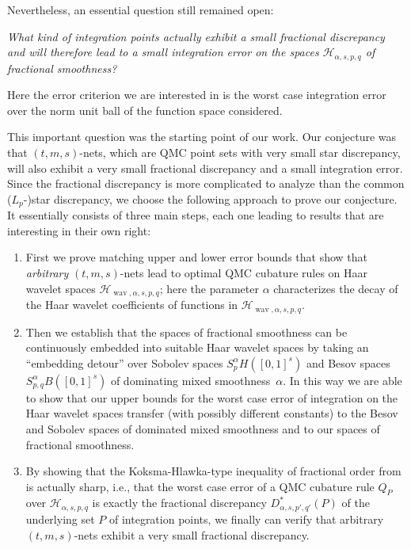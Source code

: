 \documentclass[12pt]{article}
\DeclareMathOperator{\wav}{wav}
\newcommand{\red}[1]{\textcolor{red}{#1}}
\begin{document}
Nevertheless, an essential question still remained open: 
\vspace{1.5ex}

\emph{What kind of integration points actually exhibit a small fractional discrepancy and will therefore lead to a small integration error on the spaces
$\mathcal{H}_{\alpha, s, p,q}$ of fractional smoothness?}
\vspace{1.5ex}

Here the error criterion we are interested in is the worst case integration error over the norm unit ball of the function space considered.

This important question was the starting point of our work.
Our conjecture was that $(t,m,s)$-nets, which are QMC point sets with very small star discrepancy, will also exhibit a very small fractional discrepancy and a small integration error.
Since the fractional discrepancy is more complicated to analyze than the common ($L_{p}$-)star discrepancy, we choose %
the following approach to prove our conjecture. It essentially consists of three main steps, each one leading to results that are interesting in their own right: 
\begin{enumerate}
\item First we prove matching upper and lower error bounds that show that \emph{arbitrary} $(t,m,s)$-nets lead to optimal QMC cubature rules on Haar wavelet  spaces $\mathcal{H}_{\wav, \alpha, s, p,q}$; here the parameter $\alpha$ characterizes the decay of the Haar wavelet coefficients of functions in $\mathcal{H}_{\wav, \alpha, s, p,q}$. 
\item Then we establish that %
the spaces of fractional smoothness %
can be continuously embedded into %
suitable Haar wavelet spaces
by taking an ``embedding detour'' over Sobolev spaces $S^\alpha_p H([0,1]^s)$ and Besov spaces $S^\alpha_{p,q}B([0,1]^s)$ of dominating mixed smoothness~$\alpha$.
In this way we are able to show that our upper bounds for the worst case error of integration on  
the Haar wavelet spaces transfer %
(with possibly different constants) 
to the Besov and Sobolev spaces of dominated mixed smoothness and to our spaces of fractional smoothness.
\item By showing  that the Koksma-Hlawka-type inequality of fractional order from \cite{D08} is actually sharp, i.e., that the worst case error of a QMC cubature rule $Q_P$ over $\mathcal{H}_{\alpha, s, p,q}$ is exactly the fractional discrepancy $D^*_{\alpha,s,p',q'}(P)$ of the underlying set $P$ of integration points,
we finally can verify that arbitrary $(t,m,s)$-nets exhibit a very small fractional discrepancy.
\end{enumerate}
\end{document}
